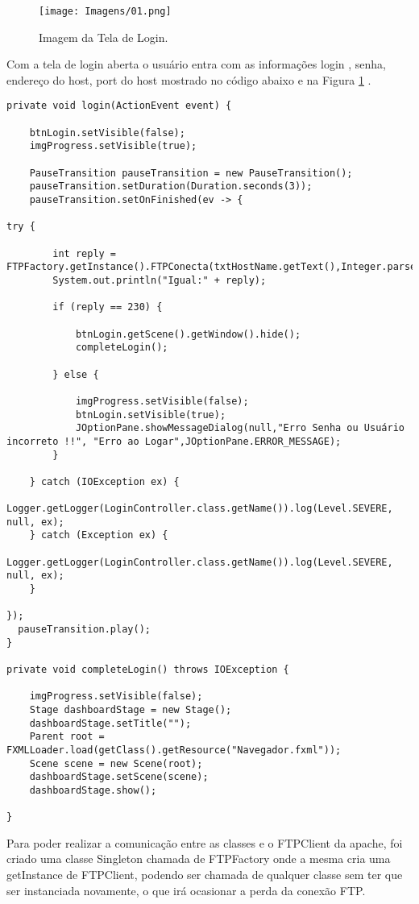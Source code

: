 \documentclass[12pt]{article}
\begin{document}
\begin{figure}[H]
	\centering
	\texttt{[image: Imagens/01.png]}
	\caption{ Imagem da Tela de Login.}
	\label{fig:02}
\end{figure}

Com a tela de login aberta o usuário entra com as informações login , senha, endereço do host, port do host mostrado no código abaixo e na Figura \ref{fig:02} .
\vspace{.4cm}
\begin{lstlisting}
private void login(ActionEvent event) {

	btnLogin.setVisible(false);
	imgProgress.setVisible(true);
	
	PauseTransition pauseTransition = new PauseTransition();
	pauseTransition.setDuration(Duration.seconds(3));
	pauseTransition.setOnFinished(ev -> {

try {
	
		int reply = FTPFactory.getInstance().FTPConecta(txtHostName.getText(),Integer.parseInt(txtHostPort.getText()),this.txtUsername.getText(),this.txtPassword.getText());
		System.out.println("Igual:" + reply);
		
		if (reply == 230) {
		
			btnLogin.getScene().getWindow().hide();
			completeLogin();
		
		} else {
		
			imgProgress.setVisible(false);
			btnLogin.setVisible(true);
			JOptionPane.showMessageDialog(null,"Erro Senha ou Usuário incorreto !!", "Erro ao Logar",JOptionPane.ERROR_MESSAGE);
		}

	} catch (IOException ex) {
		Logger.getLogger(LoginController.class.getName()).log(Level.SEVERE, null, ex);
	} catch (Exception ex) {
		Logger.getLogger(LoginController.class.getName()).log(Level.SEVERE, null, ex);
	}

});
  pauseTransition.play();
}

private void completeLogin() throws IOException {
	
	imgProgress.setVisible(false);
	Stage dashboardStage = new Stage();
	dashboardStage.setTitle("");
	Parent root = FXMLLoader.load(getClass().getResource("Navegador.fxml"));
	Scene scene = new Scene(root);
	dashboardStage.setScene(scene);
	dashboardStage.show();
	
}

\end{lstlisting}


Para poder realizar a comunicação entre as classes e o FTPClient da apache, foi criado uma classe Singleton chamada de FTPFactory onde a mesma cria uma getInstance de FTPClient, podendo ser chamada de qualquer classe sem ter que ser instanciada novamente, o que irá ocasionar a perda da conexão FTP.
\end{document}
